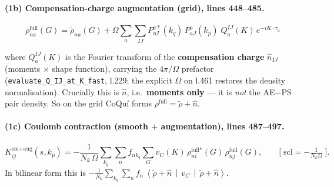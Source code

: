 \documentclass[11pt]{article}
\newcommand{\rt}{\tilde{\rho}}
\newcommand{\vc}{v_C}
\newcommand{\avg}[3]{\left\langle #1 \,\middle|\, #2 \,\middle|\, #3 \right\rangle}
\newcommand{\code}[1]{\texttt{\small #1}}
\begin{document}
\paragraph{(1b) Compensation-charge augmentation (grid), lines 448--485.}
\begin{keybox}
\vspace{-2pt}
\begin{equation}
\rho^{\text{full}}_{na}(G) = \rt_{na}(G)
   + \Omega\sum_a\sum_{IJ} P^{a*}_{nI}(k_q)\,P^{a}_{aJ}(k_p)\;
          Q^{IJ}_a(K)\,e^{-iK\cdot\tau_a}
\end{equation}
\vspace{-8pt}
\end{keybox}
where $Q^{IJ}_a(K)$ is the Fourier transform of the \textbf{compensation charge}
$\hat n_{IJ}$ (moments $\times$ shape function), carrying the $4\pi/\Omega$ prefactor
(\code{evaluate\_Q\_IJ\_at\_K\_fast}, l.229; the explicit $\Omega$ on l.461 restores
the density normalisation). Crucially this is $\hat n$, i.e.\ \textbf{moments only}
--- it is \emph{not} the AE$-$PS pair density. So on the grid CoQu\'i forms
$\rho^{\text{full}} = \rt + \hat n$.

\paragraph{(1c) Coulomb contraction (smooth $+$ augmentation), lines 487--497.}
\begin{equation}
K^{\text{sm+aug}}_{ij}(s,k_p) = -\frac{1}{N_k\,\Omega}\sum_{k_q}\sum_n f_{n k_q}
   \sum_G \vc(K)\,\rho^{\text{full}*}_{ni}(G)\,\rho^{\text{full}}_{nj}(G),
\qquad \Big[\;\mathrm{scl}=-\tfrac{1}{N_k\Omega}\;\Big].
\end{equation}
In bilinear form this is
$-\tfrac{1}{N_k}\sum_{k_q}\sum_n f_n\,\avg{\rt+\hat n}{\vc}{\rt+\hat n}$.
\end{document}
